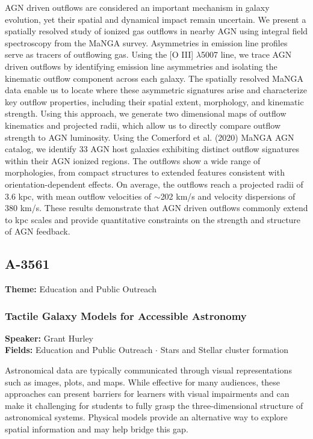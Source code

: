 AGN driven outflows are considered an important mechanism in galaxy evolution, yet their spatial and dynamical impact remain uncertain. We present a spatially resolved study of ionized gas outflows in nearby AGN using integral field spectroscopy from the MaNGA survey. Asymmetries in emission line profiles serve as tracers of outflowing gas. Using the [O III] $\lambda$5007 line, we trace AGN driven outflows by identifying emission line asymmetries and isolating the kinematic outflow component across each galaxy. The spatially resolved MaNGA data enable us to locate where these asymmetric signatures arise and characterize key outflow properties, including their spatial extent, morphology, and kinematic strength. Using this approach, we generate two dimensional maps of outflow kinematics and projected radii, which allow us to directly compare outflow strength to AGN luminosity. Using the Comerford et al. (2020) MaNGA AGN catalog, we identify 33 AGN host galaxies exhibiting distinct outflow signatures within their AGN ionized regions. The outflows show a wide range of morphologies, from compact structures to extended features consistent with orientation-dependent effects. On average, the outflows reach a projected radii of 3.6 kpc, with mean outflow velocities of $\sim$202 km/s and velocity dispersions of 380 km/s. These results demonstrate that AGN driven outflows commonly extend to kpc scales and provide quantitative constraints on the strength and structure of AGN feedback.

\subsection*{A-3561}
\textbf{Theme:} Education and Public Outreach

\hypertarget{abstract-talk-180}{}\label{abstract-page-talk-180}
\subsubsection*{Tactile Galaxy Models for Accessible Astronomy}
\textbf{Speaker:} Grant Hurley\\
\textbf{Fields:} Education and Public Outreach $\cdot$ Stars and Stellar cluster formation

Astronomical data are typically communicated through visual representations such as images, plots, and maps. While effective for many audiences, these approaches can present barriers for learners with visual impairments and can make it challenging for students to fully grasp the three-dimensional structure of astronomical systems. Physical models provide an alternative way to explore spatial information and may help bridge this gap.

